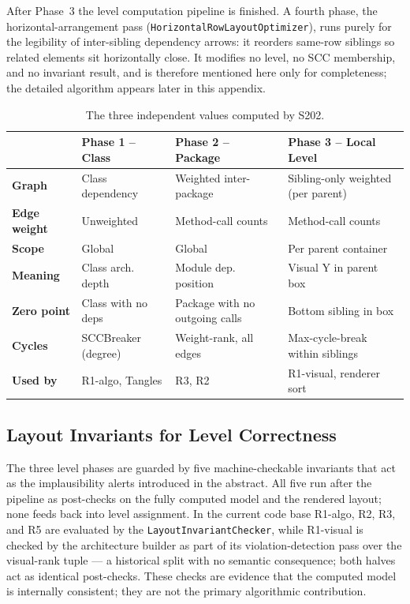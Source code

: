 \documentclass[a4paper,twoside]{article}
\begin{document}
After Phase~3 the level computation pipeline is finished. A fourth phase, the
horizontal-arrangement pass (\texttt{HorizontalRowLayoutOptimizer}),
runs purely for the legibility of inter-sibling dependency arrows:
it reorders same-row siblings so related elements sit horizontally
close. It modifies no level, no SCC membership, and no invariant
result, and is therefore mentioned here only for completeness; the
detailed algorithm appears later in this appendix.

\begin{table}[h]
\centering
\small
\begin{tabular}{llll}
\hline
 & \textbf{Phase 1 -- Class} & \textbf{Phase 2 -- Package} & \textbf{Phase 3 -- Local Level} \\
\hline
\textbf{Graph}        & Class dependency             & Weighted inter-package        & Sibling-only weighted (per parent) \\
\textbf{Edge weight}  & Unweighted                   & Method-call counts            & Method-call counts \\
\textbf{Scope}        & Global                       & Global                        & Per parent container \\
\textbf{Meaning}      & Class arch. depth            & Module dep. position          & Visual Y in parent box \\
\textbf{Zero point}   & Class with no deps           & Package with no outgoing calls & Bottom sibling in box \\
\textbf{Cycles}       & SCCBreaker (degree)          & Weight-rank, all edges        & Max-cycle-break within siblings \\
\textbf{Used by}      & R1-algo, Tangles             & R3, R2                        & R1-visual, renderer sort \\
\hline
\end{tabular}
\caption{The three independent values computed by S202.}
\end{table}

\subsection*{Layout Invariants for Level Correctness}

The three level phases are guarded by five machine-checkable invariants
that act as the implausibility alerts introduced in the abstract. All five
run after the pipeline as post-checks on the fully computed model and the
rendered layout; none feeds back into level assignment. In the current code
base R1-algo, R2, R3, and R5 are evaluated by the
\texttt{LayoutInvariantChecker}, while R1-visual is checked by the
architecture builder as part of its violation-detection pass over the
visual-rank tuple --- a historical split with no semantic consequence; both
halves act as identical post-checks. These checks are evidence that the
computed model is internally consistent; they are not the primary
algorithmic contribution.
\end{document}
